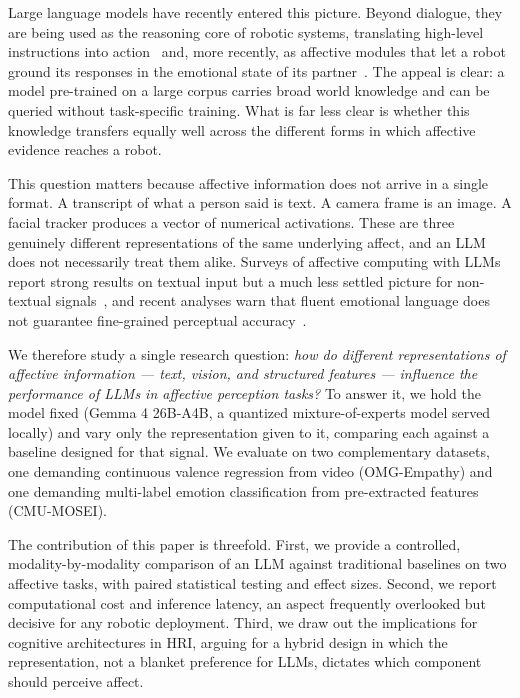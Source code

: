\documentclass[conference]{IEEEtran}
\begin{document}
Large language models have recently entered this picture. Beyond dialogue, they are being used as the reasoning core of robotic systems, translating high-level instructions into action~\cite{Ahn2022SayCan, Zitkovich2023RT2, Kawaharazuka2024RobotLLMSurvey, Vemprala2023ChatGPTRobotics} and, more recently, as affective modules that let a robot ground its responses in the emotional state of its partner~\cite{Magalhaes2024Nadine, Churamani2024EmpathicGrounding, Laban2024LLMsHRI}. The appeal is clear: a model pre-trained on a large corpus carries broad world knowledge and can be queried without task-specific training. What is far less clear is whether this knowledge transfers equally well across the different forms in which affective evidence reaches a robot.

This question matters because affective information does not arrive in a single format. A transcript of what a person said is text. A camera frame is an image. A facial tracker produces a vector of numerical activations. These are three genuinely different representations of the same underlying affect, and an LLM does not necessarily treat them alike. Surveys of affective computing with LLMs report strong results on textual input but a much less settled picture for non-textual signals~\cite{Survey2024AffectiveLLM, Survey2025MLLMEmotion, Survey2024TextCentric}, and recent analyses warn that fluent emotional language does not guarantee fine-grained perceptual accuracy~\cite{Zhang2025FluentUnfeeling}.

We therefore study a single research question: \emph{how do different representations of affective information --- text, vision, and structured features --- influence the performance of LLMs in affective perception tasks?} To answer it, we hold the model fixed (Gemma 4 26B-A4B, a quantized mixture-of-experts model served locally) and vary only the representation given to it, comparing each against a baseline designed for that signal. We evaluate on two complementary datasets, one demanding continuous valence regression from video (OMG-Empathy) and one demanding multi-label emotion classification from pre-extracted features (CMU-MOSEI).

The contribution of this paper is threefold. First, we provide a controlled, modality-by-modality comparison of an LLM against traditional baselines on two affective tasks, with paired statistical testing and effect sizes. Second, we report computational cost and inference latency, an aspect frequently overlooked but decisive for any robotic deployment. Third, we draw out the implications for cognitive architectures in HRI, arguing for a hybrid design in which the representation, not a blanket preference for LLMs, dictates which component should perceive affect.
\end{document}
